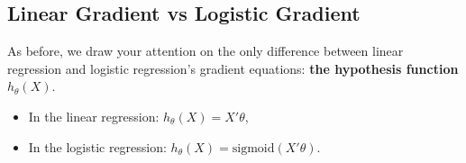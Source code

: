 \subsection*{Linear Gradient vs Logistic Gradient}
As before, we draw your attention on the only difference between linear regression and logistic regression's gradient equations: \textbf{the hypothesis function} $h_\theta(X)$.
\begin{itemize}
    \item In the linear regression: $h_\theta(X) = X'\theta$,
    \item In the logistic regression: $h_\theta(X) = \text{sigmoid}(X'\theta)$.
\end{itemize}
